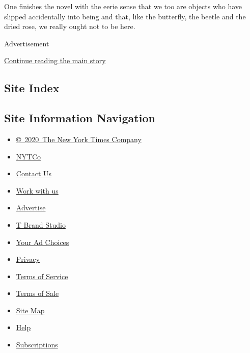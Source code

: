 One finishes the novel with the eerie sense that we too are objects who
have slipped accidentally into being and that, like the butterfly, the
beetle and the dried rose, we really ought not to be here.

Advertisement

\protect\hyperlink{after-bottom}{Continue reading the main story}

\hypertarget{site-index}{%
\subsection{Site Index}\label{site-index}}

\hypertarget{site-information-navigation}{%
\subsection{Site Information
Navigation}\label{site-information-navigation}}

\begin{itemize}
\tightlist
\item
  \href{https://help.nytimes.com/hc/en-us/articles/115014792127-Copyright-notice}{©~2020~The
  New York Times Company}
\end{itemize}

\begin{itemize}
\tightlist
\item
  \href{https://www.nytco.com/}{NYTCo}
\item
  \href{https://help.nytimes.com/hc/en-us/articles/115015385887-Contact-Us}{Contact
  Us}
\item
  \href{https://www.nytco.com/careers/}{Work with us}
\item
  \href{https://nytmediakit.com/}{Advertise}
\item
  \href{http://www.tbrandstudio.com/}{T Brand Studio}
\item
  \href{https://www.nytimes.com/privacy/cookie-policy\#how-do-i-manage-trackers}{Your
  Ad Choices}
\item
  \href{https://www.nytimes.com/privacy}{Privacy}
\item
  \href{https://help.nytimes.com/hc/en-us/articles/115014893428-Terms-of-service}{Terms
  of Service}
\item
  \href{https://help.nytimes.com/hc/en-us/articles/115014893968-Terms-of-sale}{Terms
  of Sale}
\item
  \href{https://spiderbites.nytimes.com}{Site Map}
\item
  \href{https://help.nytimes.com/hc/en-us}{Help}
\item
  \href{https://www.nytimes.com/subscription?campaignId=37WXW}{Subscriptions}
\end{itemize}
